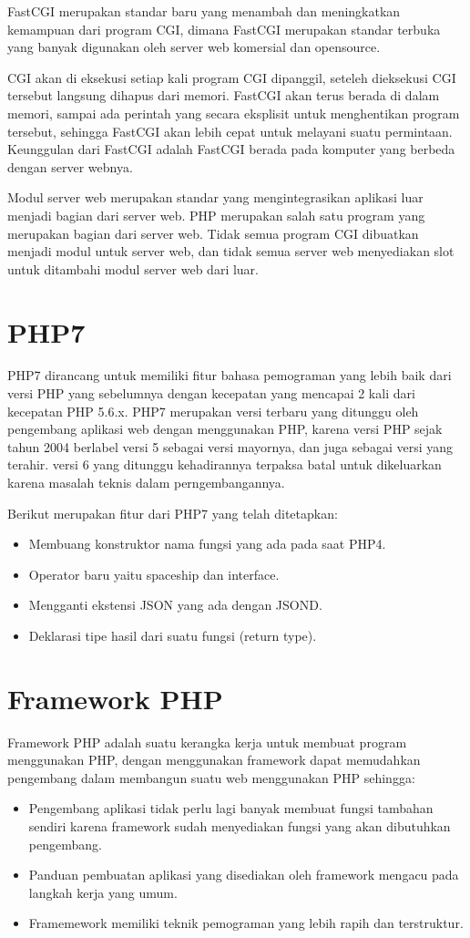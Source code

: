 FastCGI merupakan standar baru yang menambah dan meningkatkan kemampuan dari program CGI, dimana FastCGI merupakan standar  terbuka yang banyak digunakan oleh server web komersial dan opensource.

CGI akan di eksekusi setiap  kali program CGI dipanggil, seteleh dieksekusi CGI tersebut langsung dihapus dari memori. FastCGI akan terus berada di dalam memori, sampai ada perintah  yang secara eksplisit untuk menghentikan program tersebut, sehingga FastCGI akan lebih cepat untuk melayani suatu permintaan. Keunggulan dari FastCGI adalah FastCGI  berada pada komputer yang berbeda dengan server webnya.

Modul server web merupakan standar yang mengintegrasikan aplikasi luar menjadi bagian dari server web. PHP merupakan salah satu program yang merupakan bagian dari server web. Tidak semua program CGI dibuatkan menjadi modul untuk server web, dan tidak semua server web menyediakan slot untuk ditambahi modul server web dari luar. 

\section{PHP7}
PHP7 dirancang untuk memiliki fitur bahasa pemograman yang lebih baik dari versi PHP yang sebelumnya dengan kecepatan yang mencapai 2 kali dari kecepatan PHP 5.6.x. PHP7 merupakan versi terbaru yang ditunggu oleh pengembang aplikasi web dengan menggunakan PHP, karena versi PHP sejak tahun 2004 berlabel versi 5 sebagai versi mayornya, dan juga sebagai versi yang terahir. versi 6 yang ditunggu kehadirannya terpaksa batal untuk dikeluarkan karena masalah teknis dalam perngembangannya.

Berikut merupakan fitur dari PHP7 yang telah ditetapkan:
\begin{itemize}
\item Membuang konstruktor nama fungsi yang ada pada saat PHP4.
\item Operator baru yaitu spaceship dan interface.
\item Mengganti ekstensi JSON yang ada dengan JSOND.
\item Deklarasi tipe hasil dari suatu fungsi (return type).
\end{itemize}

\section{Framework PHP}
Framework PHP adalah suatu kerangka kerja untuk membuat program menggunakan PHP, dengan menggunakan framework dapat memudahkan pengembang dalam membangun suatu web menggunakan PHP sehingga:
\begin{itemize}
\item Pengembang aplikasi tidak perlu lagi banyak membuat fungsi tambahan sendiri karena framework sudah menyediakan fungsi yang akan dibutuhkan pengembang.
\item Panduan pembuatan aplikasi yang disediakan oleh framework mengacu pada langkah kerja yang umum.
\item Framemework memiliki teknik pemograman yang lebih rapih dan terstruktur.
\end{itemize}
